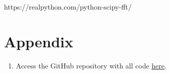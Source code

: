 \documentclass{article}
\begin{document}
\begin{thebibliography}{9} %
     https://realpython.com/python-scipy-fft/
\end{thebibliography}

\section{Appendix}
\begin{enumerate}
    \item Access the GitHub repository with all code \href{https://github.com/margheritatonon/approximation-II-assignment}{here}.
\end{enumerate}
\end{document}
